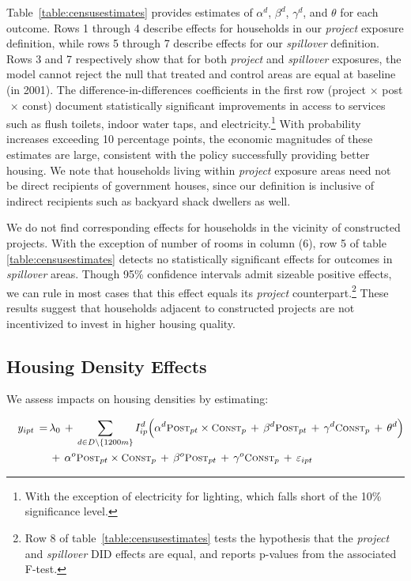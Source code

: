 \documentclass[12pt]{article}
\begin{document}
Table~\ref{table:censusestimates} provides estimates of $\alpha^d$, $\beta^d$, $\gamma^d$, and $\theta$ for each outcome. Rows 1 through 4 describe effects for households in our {\it project} exposure definition, while rows 5 through 7 describe effects for our {\it spillover} definition. Rows 3 and 7 respectively show that for both {\it project} and {\it spillover} exposures, the model cannot reject the null that treated and control areas are equal at baseline (in 2001). The difference-in-differences coefficients in the first row (project$\,\times\,$post$\,\times\,$const) document statistically significant improvements in access to services such as flush toilets, indoor water taps, and electricity.\footnote{With the exception of electricity for lighting, which falls short of the 10\% significance level. } With probability increases exceeding 10 percentage points, the economic magnitudes of these estimates are large, consistent with the policy successfully providing better housing. We note that households living within {\it project} exposure areas need not be direct recipients of government houses, since our definition is inclusive of indirect recipients such as backyard shack dwellers as well. 

We do not find corresponding effects for households in the vicinity of constructed projects. With the exception of number of rooms in column (6), row 5 of table \ref{table:censusestimates} detects no statistically significant effects for outcomes in {\it spillover} areas. Though 95\% confidence intervals admit sizeable positive effects, we can rule in most cases that this effect equals its {\it project} counterpart.\footnote{Row 8 of table~\ref{table:censusestimates} tests the hypothesis that the {\it project} and {\it spillover} DID effects are equal, and reports p-values from the associated F-test.} These results suggest that households adjacent to constructed projects are not incentivized to invest in higher housing quality. 


\subsection{Housing Density Effects}\label{section:bbluestimates}

We assess impacts on housing densities by estimating:

\vspace{-4mm}

\begin{equation} \label{eq:bblu}
\begin{aligned}
\quad y_{ipt} \, =& \, \lambda_{0} \,+\, \sum\limits_{d\in D\setminus\{1200m\}} I^d_{ip}\Big( \alpha^d \textsc{\small Post}_{pt}\times\textsc{\small Const}_{p} \, + \, \beta^d\textsc{\small Post}_{pt} \, + \, \gamma^d\textsc{\small Const}_{p} \, + \, \theta^{d} \Big) \\
& \, + \, \alpha^o \textsc{\small Post}_{pt}\times\textsc{\small Const}_{p} \, + \, \beta^o\textsc{\small Post}_{pt} \, + \, \gamma^o\textsc{\small Const}_{p} \, + \, \varepsilon_{ipt} \quad 
\end{aligned}
\end{equation}
\end{document}
